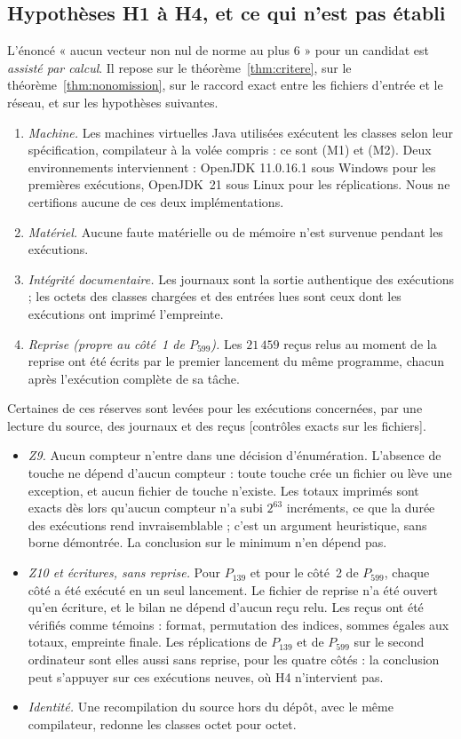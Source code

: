 \documentclass[11pt,a4paper]{amsart}
\theoremstyle{plain}
\theoremstyle{definition}
\numberwithin{equation}{section}
\newcommand{\st}[1]{\textup{\textsf{\small[#1]}}}
\begin{document}
\subsection{Hypothèses H1 à H4, et ce qui n'est pas établi}\label{subsec:hyp}
L'énoncé « aucun vecteur non nul de norme au plus $6$ » pour un candidat est \emph{assisté par calcul}. Il repose sur le théorème~\ref{thm:critere}, sur le théorème~\ref{thm:nonomission}, sur le raccord exact entre les fichiers d'entrée et le réseau, et sur les hypothèses suivantes.
\begin{enumerate}[label=\textup{(H\arabic*)}]
\item \emph{Machine.} Les machines virtuelles Java utilisées exécutent les classes selon leur spécification, compilateur à la volée compris : ce sont (M1) et (M2). Deux environnements interviennent : OpenJDK 11.0.16.1 sous Windows pour les premières exécutions, OpenJDK~21 sous Linux pour les réplications. Nous ne certifions aucune de ces deux implémentations.
\item \emph{Matériel.} Aucune faute matérielle ou de mémoire n'est survenue pendant les exécutions.
\item \emph{Intégrité documentaire.} Les journaux sont la sortie authentique des exécutions ; les octets des classes chargées et des entrées lues sont ceux dont les exécutions ont imprimé l'empreinte.
\item \emph{Reprise (propre au côté~1 de $P_{599}$).} Les $21\,459$ reçus relus au moment de la reprise ont été écrits par le premier lancement du même programme, chacun après l'exécution complète de sa tâche.
\end{enumerate}

Certaines de ces réserves sont levées pour les exécutions concernées, par une lecture du source, des journaux et des reçus \st{contrôles exacts sur les fichiers}.
\begin{itemize}
\item \emph{Z9.} Aucun compteur n'entre dans une décision d'énumération. L'absence de touche ne dépend d'aucun compteur : toute touche crée un fichier ou lève une exception, et aucun fichier de touche n'existe. Les totaux imprimés sont exacts dès lors qu'aucun compteur n'a subi $2^{63}$ incréments, ce que la durée des exécutions rend invraisemblable ; c'est un argument heuristique, sans borne démontrée. La conclusion sur le minimum n'en dépend pas.
\item \emph{Z10 et écritures, sans reprise.} Pour $P_{139}$ et pour le côté~2 de $P_{599}$, chaque côté a été exécuté en un seul lancement. Le fichier de reprise n'a été ouvert qu'en écriture, et le bilan ne dépend d'aucun reçu relu. Les reçus ont été vérifiés comme témoins : format, permutation des indices, sommes égales aux totaux, empreinte finale. Les réplications de $P_{139}$ et de $P_{599}$ sur le second ordinateur sont elles aussi sans reprise, pour les quatre côtés : la conclusion peut s'appuyer sur ces exécutions neuves, où H4 n'intervient pas.
\item \emph{Identité.} Une recompilation du source hors du dépôt, avec le même compilateur, redonne les classes octet pour octet.
\end{itemize}
\end{document}
